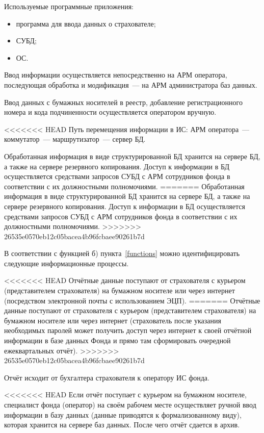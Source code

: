 \point Используемые программные приложения:

\begin{itemize}
\item программа для ввода данных о страхователе;
\item СУБД;
\item ОС.
\end{itemize}

\point Ввод информации осуществляется непосредственно на АРМ оператора, последующая обработка и модификация~--- на АРМ администратора баз данных.

Ввод данных с бумажных носителей в реестр, добавление регистрационного номера и кода подчиненности осуществляется оператором вручную.

<<<<<<< HEAD
\point Путь перемещения информации в ИС: АРМ оператора~---
коммутатор~--- маршрутизатор~--- сервер БД.

\point Обработанная информация в виде структурированной БД хранится на
сервере БД, а также на сервере резервного копирования. Доступ к
информации в БД осуществляется средствами запросов СУБД с АРМ
сотрудников фонда в соответствии с их должностными полномочиями.
=======
\point Обработанная информация в виде структурированной БД хранится на сервере БД, а также на сервере резервного копирования. Доступ к информации в БД осуществляется средствами запросов СУБД с АРМ сотрудников фонда в соответствии с их должностными полномочиями.
>>>>>>> 26535e0570eb12c05bacea4b96fcbaee90261b7d

В соответствии с функцией б) пункта~\ref{functions} можно идентифицировать следующие информационные процессы.

<<<<<<< HEAD
\point Отчётные данные поступают от страхователя с курьером
(представителем страхователя) на бумажном носителе или через интернет
(посредством электронной почты с использованием ЭЦП).
=======
\point Отчётные данные поступают от страхователя с курьером (представителем страхователя) на бумажном носителе или через интернет (страхователь после указания необходимых паролей может получить доступ через интернет к своей отчётной информации в базе данных Фонда и прямо там сформировать очередной ежеквартальных отчёт).
>>>>>>> 26535e0570eb12c05bacea4b96fcbaee90261b7d

Отчёт исходит от бухгалтера страхователя к оператору ИС фонда.

<<<<<<< HEAD
\point Если отчёт поступает с курьером на бумажном носителе,
специалист фонда (оператор) на своём рабочем месте осуществляет ручной
ввод информации в базу данных (данные приводятся к формализованному
виду), которая хранится на сервере баз данных. После чего отчёт
сдается в архив.

